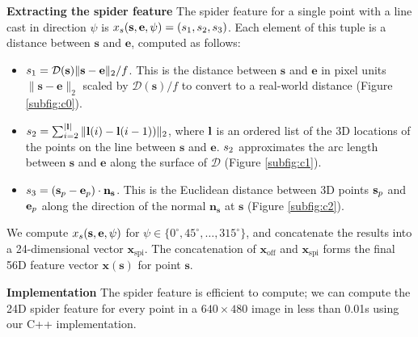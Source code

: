 \documentclass[10pt,twocolumn,letterpaper]{article}
\newcommand{\degree}{^{\circ}}
\newcommand{\feat}{\mathbf{x}}
\newcommand{\rgbdimage}{\mathcal{D}}
\newcommand{\pixelidx}{\mathbf{s}}
\newcommand{\edgeimidx}{\mathbf{e}}
\newcommand{\normal}{\mathbf{n}}
\renewcommand{\paragraph}{\vspace{2pt}\noindent\textbf}
\begin{document}
\paragraph{Extracting the spider feature}
The spider feature for a single point with a line cast in direction $\psi$ is $\scalfeat_s(\pixelidx, \edgeimidx, \psi) = (\spiderfeat_1, \spiderfeat_2, \spiderfeat_3)$.
Each element of this tuple is a distance between $\pixelidx$ and $\edgeimidx$, computed as follows:
\begin{itemize}

\item $\spiderfeat_1 = \rgbdimage(\pixelidx) \|\pixelidx - \edgeimidx\|_2 / f$. This is the distance between $\pixelidx$ and $\edgeimidx$ in pixel units $\|\pixelidx - \edgeimidx\|_2$ scaled by $\rgbdimage(\pixelidx) / f$ to convert to a real-world distance (Figure \ref{subfig:c0}).

\item $s_2 = \sum_{i=2}^{|\mathbf{l}|} \| \mathbf{l}(i) - \mathbf{l}(i-1)) \|_2 $, where $\mathbf{l}$ is an ordered list of the 3D locations of the points on the line between $\pixelidx$ and $\edgeimidx$.
$s_2$ approximates the arc length between $\pixelidx$ and $\edgeimidx$ along the surface of $\rgbdimage$  (Figure \ref{subfig:c1}).

\item $\spiderfeat_3 = (\pointthreed - \edgethreed) \cdot \normal_\pixelidx$.
This is the Euclidean distance between 3D points $\pointthreed$ and $\edgethreed$ along the direction of the normal $\normal_\pixelidx$ at $\pixelidx$  (Figure \ref{subfig:c2}).

\end{itemize}

We compute $\scalfeat_s(\pixelidx, \edgeimidx, \psi)$ for  $\psi \in \{0\degree, 45\degree, \ldots, 315\degree\}$, and concatenate the results into a  24-dimensional vector $\feat_{\text{spi}}$.
The concatenation of $\feat_\text{off}$ and $\feat_\text{spi}$ forms the final 56D feature vector $\feat(\pixelidx)$ for point $\pixelidx$.

\paragraph{Implementation}
The spider feature is efficient to compute; we can compute the 24D spider feature for every point in a $640\times480$ image in less than 0.01s using our C++ implementation.
\end{document}
